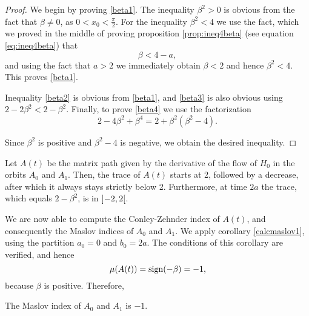 \begin{proof}
We begin by proving \eqref{beta1}. The inequality $\beta^2 > 0$ is obvious from the fact that $\beta \neq 0$, as $0 < x_0 < \frac\pi2$. For the inequality $\beta^2 < 4$ we use the fact, which we proved in the middle of proving proposition \ref{prop:ineq4beta} (see equation \eqref{eq:ineq4beta}) that
\begin{equation}
\beta < 4 - a,
\end{equation}
and using the fact that $a > 2$ we immediately obtain $\beta < 2$ and hence $\beta^2 < 4$. This proves \eqref{beta1}.

Inequality \eqref{beta2} is obvious from \eqref{beta1}, and \eqref{beta3} is also obvious using $2 - 2 \beta^2 < 2 - \beta^2$. Finally, to prove \eqref{beta4} we use the factorization
\begin{equation}
2 - 4 \beta^2 + \beta^4 = 2 + \beta^2 (\beta^2 - 4).
\end{equation}

Since $\beta^2$ is positive and $\beta^2 - 4$ is negative, we obtain the desired inequality.
\end{proof}

\begin{corollary}
Let $A(t)$ be the matrix path given by the derivative of the flow of $H_0$ in the orbits $A_0$ and $A_1$. Then, the trace of $A(t)$ starts at 2, followed by a decrease, after which it always stays strictly below 2. Furthermore, at time $2a$ the trace, which equals $2 - \beta^2$, is in $\ointerval{-2}2$.
\end{corollary}

We are now able to compute the Conley-Zehnder index of $A(t)$, and consequently the Maslov indices of $A_0$ and $A_1$. We apply corollary \ref{calcmaslov1}, using the partition $a_0 = 0$ and $b_0 = 2a$. The conditions of this corollary are verified, and hence
\begin{equation}
\mu(A(t)) = \operatorname{sign}(-\beta) = -1,
\end{equation}
because $\beta$ is positive. Therefore,

\begin{prop}
The Maslov index of $A_0$ and $A_1$ is $-1$.
\end{prop}

